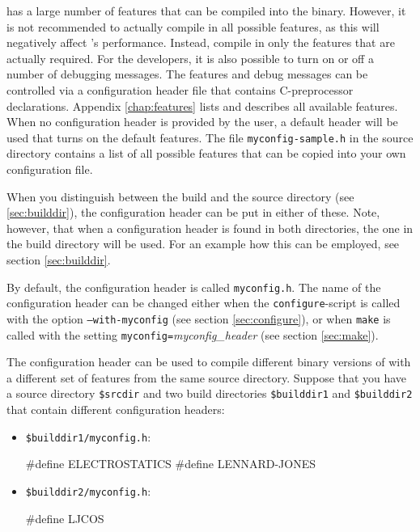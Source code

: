    \es
has a large number of features that can be compiled into the binary.
However, it is not recommended to actually compile in all possible
features, as this will negatively affect \es's performance.  Instead,
compile in only the features that are actually required.  For the
developers, it is also possible to turn on or off a number of
debugging messages.  The features and debug messages can be controlled
via a configuration header file that contains C-preprocessor
declarations. Appendix \vref{chap:features} lists and describes all
available features.  When no configuration header is provided by the
user, a default header will be used that turns on the default
features.  The file \texttt{myconfig-sample.h} in the source directory
contains a list of all possible features that can be copied into your
own configuration file.

When you distinguish between the build and the source directory (see
\vref{sec:builddir}), the configuration header can be put in either of
these. Note, however, that when a configuration header is found in
both directories, the one in the build directory will be used.  For an
example how this can be employed, see section \ref{sec:builddir}.

By default, the configuration header is called \texttt{myconfig.h}.
The name of the configuration header can be changed either when the
\texttt{configure}-script is called with the option
\mbox{\texttt{--with-myconfig}} (see section \vref{sec:configure}), or
when \texttt{make} is called with the setting
\mbox{\texttt{myconfig=}\textit{myconfig\_header}} (see section
\vref{sec:make}).

The configuration header can be used to compile different binary
versions of \es with a different set of features from the same source
directory.  Suppose that you have a source directory \texttt{\$srcdir}
and two build directories \texttt{\$builddir1} and
\texttt{\$builddir2} that contain different configuration headers:

\begin{itemize}
\item \texttt{\$builddir1/myconfig.h}:
\begin{code}
#define ELECTROSTATICS
#define LENNARD-JONES
\end{code}

\item \texttt{\$builddir2/myconfig.h}:
\begin{code}
#define LJCOS
\end{code}
\end{itemize}

